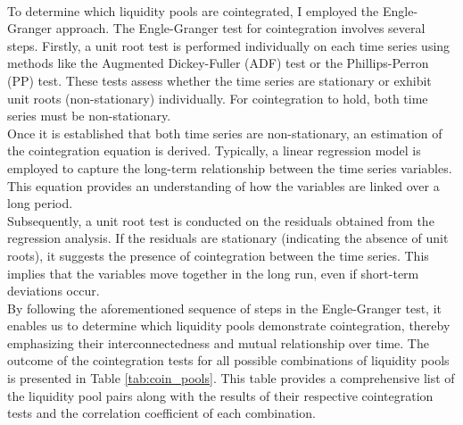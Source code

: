 \\[5mm]
To determine which liquidity pools are cointegrated, I employed the Engle-Granger approach. The Engle-Granger test for cointegration involves several steps. Firstly, a unit root test is performed individually on each time series using methods like the Augmented Dickey-Fuller (ADF) test or the Phillips-Perron (PP) test. These tests assess whether the time series are stationary or exhibit unit roots (non-stationary) individually. For cointegration to hold, both time series must be non-stationary.
\\[5mm]
Once it is established that both time series are non-stationary, an estimation of the cointegration equation is derived. Typically, a linear regression model is employed to capture the long-term relationship between the time series variables. This equation provides an understanding of how the variables are linked over a long period.
\\[5mm]
Subsequently, a unit root test is conducted on the residuals obtained from the regression analysis. If the residuals are stationary (indicating the absence of unit roots), it suggests the presence of cointegration between the time series. This implies that the variables move together in the long run, even if short-term deviations occur.
\\[5mm]
By following the aforementioned sequence of steps in the Engle-Granger test, it enables us to determine which liquidity pools demonstrate cointegration, thereby emphasizing their interconnectedness and mutual relationship over time. The outcome of the cointegration tests for all possible combinations of liquidity pools is presented in Table \ref{tab:coin_pools}. This table provides a comprehensive list of the liquidity pool pairs along with the results of their respective cointegration tests and the correlation coefficient of each combination.
